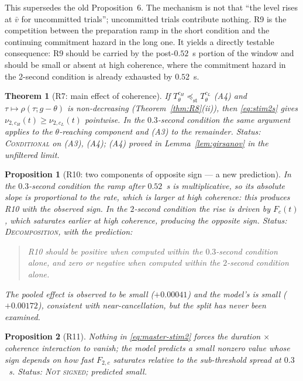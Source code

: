 \documentclass[11pt,a4paper]{article}
\newcommand{\stle}{\preceq_{\mathrm{st}}}
\theoremstyle{plain}
\newtheorem{proposition}{Proposition}
\newtheorem{theorem}{Theorem}
\theoremstyle{remark}
\begin{document}
This supersedes the old Proposition~6. The mechanism is not that ``the level rises at
$\bar v$ for uncommitted trials''; uncommitted trials contribute nothing. R9 is the
competition between the preparation ramp in the short condition and the continuing
commitment hazard in the long one. It yields a directly testable consequence: R9 should be
carried by the post-$0.52$~s portion of the window and should be small or absent at high
coherence, where the commitment hazard in the 2-second condition is already exhausted by
$0.52$~s.

\begin{theorem}[R7: main effect of coherence]
\label{thm:R7}
If $T_\theta^{c_H}\stle T_\theta^{c_L}$ (A4) and $\tau\mapsto\rho(\tau;g-\theta)$ is
non-decreasing (Theorem~\ref{thm:R8}(ii)), then \eqref{eq:stim2s} gives
$\nu_{2,c_H}(t)\ge\nu_{2,c_L}(t)$ pointwise. In the $0.3$-second condition the same
argument applies to the $\theta$-reaching component and (A3) to the remainder.
\emph{Status: \textsc{Conditional} on (A3), (A4); (A4) proved in Lemma~\ref{lem:girsanov}
in the unfiltered limit.}
\end{theorem}

\begin{proposition}[R10: two components of opposite sign --- a new prediction]
\label{prop:R10}
In the $0.3$-second condition the ramp after $0.52$~s is multiplicative, so its absolute
slope is proportional to the rate, which is larger at high coherence: this produces R10
with the observed sign. In the $2$-second condition the rise is driven by $F_c(t)$, which
saturates \emph{earlier} at high coherence, producing the opposite sign.
\emph{Status: \textsc{Decomposition}, with the prediction:}
\begin{quote}
\emph{R10 should be positive when computed within the $0.3$-second condition alone, and
zero or negative when computed within the $2$-second condition alone.}
\end{quote}
The pooled effect is observed to be small ($+0.00041$) and the model's is small
($+0.00172$), consistent with near-cancellation, but the split has never been examined.
\end{proposition}

\begin{proposition}[R11]
Nothing in \eqref{eq:master-stim2} forces the duration $\times$ coherence interaction to
vanish; the model predicts a small nonzero value whose sign depends on how fast $F_{2,c}$
saturates relative to the sub-threshold spread at $0.3$~s.
\emph{Status: \textsc{Not signed}; predicted small.}
\end{proposition}
\end{document}
